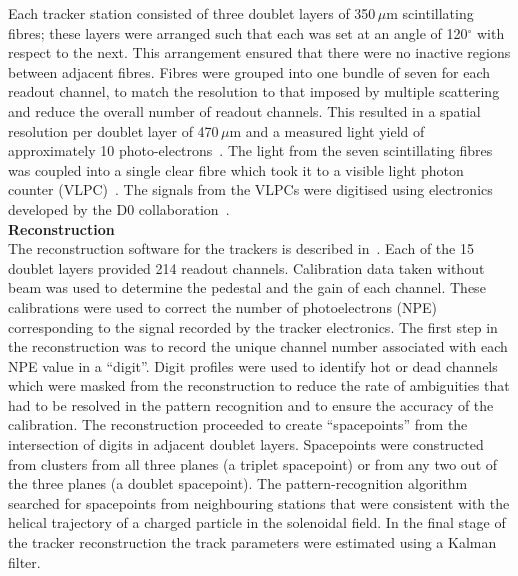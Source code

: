 Each tracker station consisted of three doublet layers of 350\,$\mu$m
scintillating fibres; these layers were arranged such that each was
set at an angle of 120$^\circ$ with respect to the next.
This arrangement ensured that there were no inactive regions between
adjacent fibres.
Fibres were grouped into one bundle of seven for each readout
channel, to match the resolution to that imposed by multiple
scattering and reduce the overall number of readout channels.
This resulted in a spatial resolution per doublet layer of 470\,$\mu$m
and a measured light yield of approximately 10
photo-electrons~\cite{Ellis:2010bb}.
The light from the seven scintillating fibres was coupled into a
single clear fibre which took it to a visible light photon counter
(VLPC)~\cite{VLPC}.
The signals from the VLPCs were digitised using electronics developed
by the D0 collaboration~\cite{Abazov:2005pn}. \\

\noindent\textbf{Reconstruction} \\
\noindent
The reconstruction software for the trackers is described
in~\cite{Dobbs:2016ejn}.
Each of the 15 doublet layers provided 214 readout channels.
Calibration data taken without beam was used to determine the pedestal and the gain of each channel.
These calibrations were used to correct the number of photoelectrons
(NPE) corresponding to the signal recorded by the tracker
electronics.
The first step in the reconstruction was to record the unique channel
number associated with each NPE value in a ``digit''.
Digit profiles were used to identify hot or dead channels which
were masked from the reconstruction to reduce the rate of ambiguities
that had to be resolved in the pattern recognition and to ensure the
accuracy of the calibration.
The reconstruction proceeded to create ``spacepoints'' from the
intersection of digits in adjacent doublet layers.
Spacepoints were constructed from clusters from all three planes (a
triplet spacepoint) or from any two out of the three planes (a doublet
spacepoint).
The pattern-recognition algorithm searched for spacepoints from
neighbouring stations that were consistent with the helical trajectory
of a charged particle in the solenoidal field.
In the final stage of the tracker reconstruction the track parameters
were estimated using a Kalman filter. \\

